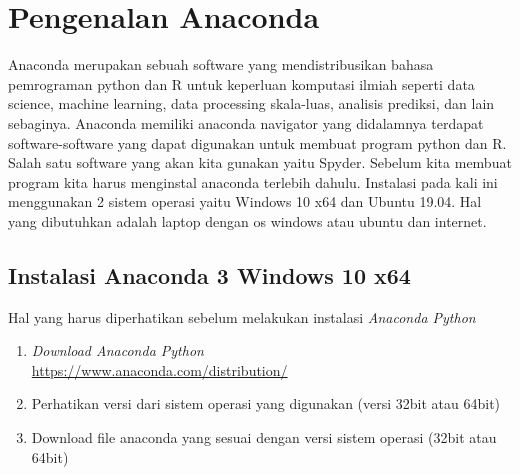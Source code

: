 \section{Pengenalan Anaconda}
Anaconda merupakan sebuah software yang mendistribusikan bahasa pemrograman python dan R untuk keperluan komputasi ilmiah seperti data science, machine learning, data processing skala-luas, analisis prediksi, dan lain sebaginya.
Anaconda memiliki anaconda navigator yang didalamnya terdapat software-software yang dapat digunakan untuk membuat program python dan R. Salah satu software yang akan kita gunakan yaitu Spyder. Sebelum kita membuat program kita harus menginstal anaconda terlebih dahulu.
Instalasi pada kali ini menggunakan 2 sistem operasi yaitu Windows 10 x64 dan Ubuntu 19.04. Hal yang dibutuhkan adalah laptop dengan os windows atau ubuntu dan internet.
\subsection{Instalasi Anaconda 3 Windows 10 x64}
Hal yang harus diperhatikan sebelum melakukan instalasi \textit{Anaconda Python}
\begin{enumerate}
 \item \textit{Download Anaconda Python} \\ \url{https://www.anaconda.com/distribution/}
 \item Perhatikan versi dari sistem operasi yang digunakan (versi 32bit atau 64bit)
 \item Download file anaconda yang sesuai dengan versi sistem operasi (32bit atau 64bit)
\end{enumerate}

